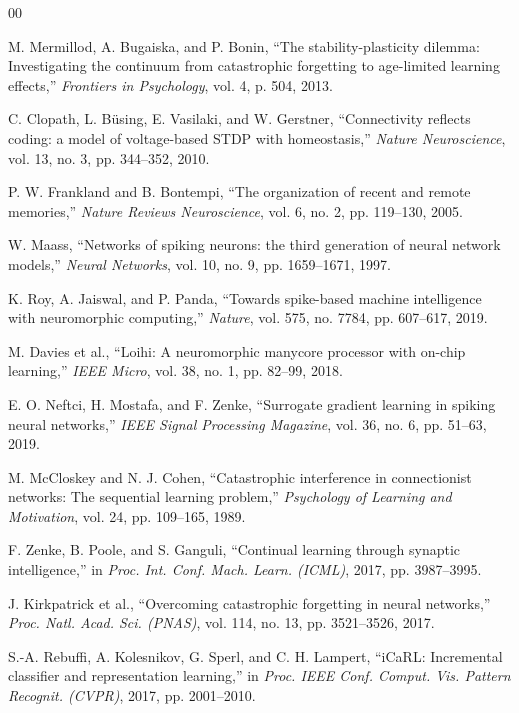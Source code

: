 \documentclass[5p,times]{elsarticle}
\begin{document}
\begin{thebibliography}{00}

 M. Mermillod, A. Bugaiska, and P. Bonin, ``The stability-plasticity dilemma: Investigating the continuum from catastrophic forgetting to age-limited learning effects,'' \textit{Frontiers in Psychology}, vol. 4, p. 504, 2013.

 C. Clopath, L. B\"using, E. Vasilaki, and W. Gerstner, ``Connectivity reflects coding: a model of voltage-based STDP with homeostasis,'' \textit{Nature Neuroscience}, vol. 13, no. 3, pp. 344--352, 2010.

 P. W. Frankland and B. Bontempi, ``The organization of recent and remote memories,'' \textit{Nature Reviews Neuroscience}, vol. 6, no. 2, pp. 119--130, 2005.

 W. Maass, ``Networks of spiking neurons: the third generation of neural network models,'' \textit{Neural Networks}, vol. 10, no. 9, pp. 1659--1671, 1997.

 K. Roy, A. Jaiswal, and P. Panda, ``Towards spike-based machine intelligence with neuromorphic computing,'' \textit{Nature}, vol. 575, no. 7784, pp. 607--617, 2019.

 M. Davies et al., ``Loihi: A neuromorphic manycore processor with on-chip learning,'' \textit{IEEE Micro}, vol. 38, no. 1, pp. 82--99, 2018.

 E. O. Neftci, H. Mostafa, and F. Zenke, ``Surrogate gradient learning in spiking neural networks,'' \textit{IEEE Signal Processing Magazine}, vol. 36, no. 6, pp. 51--63, 2019.

 M. McCloskey and N. J. Cohen, ``Catastrophic interference in connectionist networks: The sequential learning problem,'' \textit{Psychology of Learning and Motivation}, vol. 24, pp. 109--165, 1989.

 F. Zenke, B. Poole, and S. Ganguli, ``Continual learning through synaptic intelligence,'' in \textit{Proc. Int. Conf. Mach. Learn. (ICML)}, 2017, pp. 3987--3995.

 J. Kirkpatrick et al., ``Overcoming catastrophic forgetting in neural networks,'' \textit{Proc. Natl. Acad. Sci. (PNAS)}, vol. 114, no. 13, pp. 3521--3526, 2017.

 S.-A. Rebuffi, A. Kolesnikov, G. Sperl, and C. H. Lampert, ``iCaRL: Incremental classifier and representation learning,'' in \textit{Proc. IEEE Conf. Comput. Vis. Pattern Recognit. (CVPR)}, 2017, pp. 2001--2010.


\end{thebibliography}
\end{document}
